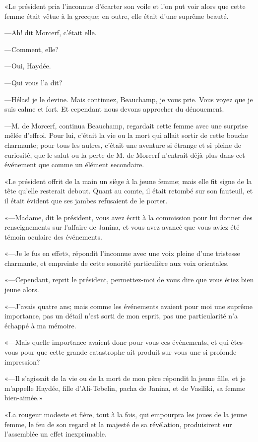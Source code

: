 «Le président pria l'inconnue d'écarter son voile et l'on put voir alors que cette femme était vêtue à la grecque; en outre, elle était d'une suprême beauté. 

—Ah! dit Morcerf, c'était elle. 

—Comment, elle? 

—Oui, Haydée. 

—Qui vous l'a dit? 

—Hélas! je le devine. Mais continuez, Beauchamp, je vous prie. Vous voyez que je suis calme et fort. Et cependant nous devons approcher du dénouement. 

—M. de Morcerf, continua Beauchamp, regardait cette femme avec une surprise mêlée d'effroi. Pour lui, c'était la vie ou la mort qui allait sortir de cette bouche charmante; pour tous les autres, c'était une aventure si étrange et si pleine de curiosité, que le salut ou la perte de M. de Morcerf n'entrait déjà plus dans cet événement que comme un élément secondaire. 

«Le président offrit de la main un siège à la jeune femme; mais elle fit signe de la tête qu'elle resterait debout. Quant au comte, il était retombé sur son fauteuil, et il était évident que ses jambes refusaient de le porter. 

«—Madame, dit le président, vous avez écrit à la commission pour lui donner des renseignements sur l'affaire de Janina, et vous avez avancé que vous aviez été témoin oculaire des événements. 

«—Je le fus en effet», répondit l'inconnue avec une voix pleine d'une tristesse charmante, et empreinte de cette sonorité particulière aux voix orientales. 

«—Cependant, reprit le président, permettez-moi de vous dire que vous étiez bien jeune alors. 

«—J'avais quatre ans; mais comme les événements avaient pour moi une suprême importance, pas un détail n'est sorti de mon esprit, pas une particularité n'a échappé à ma mémoire. 

«—Mais quelle importance avaient donc pour vous ces événements, et qui êtes-vous pour que cette grande catastrophe ait produit sur vous une si profonde impression? 

«—Il s'agissait de la vie ou de la mort de mon père répondit la jeune fille, et je m'appelle Haydée, fille d'Ali-Tebelin, pacha de Janina, et de Vasiliki, sa femme bien-aimée.» 

«La rougeur modeste et fière, tout à la fois, qui empourpra les joues de la jeune femme, le feu de son regard et la majesté de sa révélation, produisirent sur l'assemblée un effet inexprimable. 

